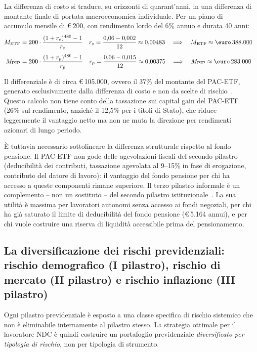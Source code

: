 La differenza di costo si traduce, su orizzonti di quarant'anni, in
una differenza di montante finale di portata macroeconomica individuale.
Per un piano di accumulo mensile di \euro\,200, con rendimento lordo del 6\%
annuo e durata 40 anni:
%
\begin{align}
  M_{\text{ETF}}  &= 200 \cdot \frac{(1+r_e)^{480} - 1}{r_e}
    \quad r_e = \frac{0{,}06 - 0{,}002}{12} \approx 0{,}00483
    \quad\Longrightarrow\quad M_{\text{ETF}} \approx \text{\euro}\,388.000
    \label{eq:pac_etf}\\[4pt]
  M_{\text{PIP}}  &= 200 \cdot \frac{(1+r_p)^{480} - 1}{r_p}
    \quad r_p = \frac{0{,}06 - 0{,}015}{12} \approx 0{,}00375
    \quad\Longrightarrow\quad M_{\text{PIP}} \approx \text{\euro}\,283.000
    \label{eq:pac_pip}
\end{align}

Il differenziale è di circa \euro\,105.000, ovvero il 37\% del montante
del PAC-ETF, generato esclusivamente dalla differenza di costo e non da
scelte di rischio~\cite{COVIP2024}. Questo calcolo non tiene conto della
tassazione sui capital gain del PAC-ETF (26\% sul rendimento, anziché
il 12,5\% per i titoli di Stato), che riduce leggermente il vantaggio
netto ma non ne muta la direzione per rendimenti azionari di lungo periodo.

È tuttavia necessario sottolineare la differenza strutturale rispetto al
fondo pensione. Il PAC-ETF non gode delle agevolazioni fiscali del secondo
pilastro (deducibilità dei contributi, tassazione agevolata al 9--15\% in
fase di erogazione, contributo del datore di lavoro): il vantaggio del fondo
pensione per chi ha accesso a queste componenti rimane superiore. Il terzo
pilastro informale è un complemento -- non un sostituto -- del secondo
pilastro istituzionale~\cite{Bosi2018, WorldBank2005}. La sua utilità è
massima per lavoratori autonomi senza accesso ai fondi negoziali, per chi
ha già saturato il limite di deducibilità del fondo pensione
(\euro\,5.164 annui), e per chi vuole costruire una riserva di liquidità
accessibile prima del pensionamento.

\subsection{La diversificazione dei rischi previdenziali:
            rischio demografico (I pilastro), rischio di mercato
            (II pilastro) e rischio inflazione (III pilastro)}
\label{subsec:diversificazione_rischi}

Ogni pilastro previdenziale è esposto a una classe specifica di rischio
sistemico che non è eliminabile internamente al pilastro stesso. La strategia
ottimale per il lavoratore NDC è quindi costruire un portafoglio previdenziale
\emph{diversificato per tipologia di rischio}, non per tipologia di strumento.


